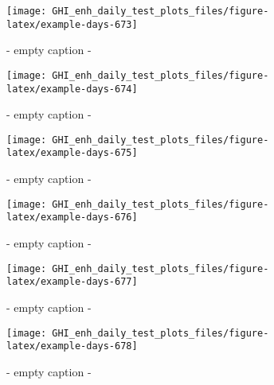 \documentclass[
  10pt,
  a4paper,oneside]{article}
\begin{document}
\begin{figure}[H]

{\centering \texttt{[image: GHI\_enh\_daily\_test\_plots\_files/figure-latex/example-days-673]} 

}

\caption{ - empty caption - }\label{fig:example-days-673}
\end{figure}

\begin{figure}[H]

{\centering \texttt{[image: GHI\_enh\_daily\_test\_plots\_files/figure-latex/example-days-674]} 

}

\caption{ - empty caption - }\label{fig:example-days-674}
\end{figure}

\begin{figure}[H]

{\centering \texttt{[image: GHI\_enh\_daily\_test\_plots\_files/figure-latex/example-days-675]} 

}

\caption{ - empty caption - }\label{fig:example-days-675}
\end{figure}

\begin{figure}[H]

{\centering \texttt{[image: GHI\_enh\_daily\_test\_plots\_files/figure-latex/example-days-676]} 

}

\caption{ - empty caption - }\label{fig:example-days-676}
\end{figure}

\begin{figure}[H]

{\centering \texttt{[image: GHI\_enh\_daily\_test\_plots\_files/figure-latex/example-days-677]} 

}

\caption{ - empty caption - }\label{fig:example-days-677}
\end{figure}

\begin{figure}[H]

{\centering \texttt{[image: GHI\_enh\_daily\_test\_plots\_files/figure-latex/example-days-678]} 

}

\caption{ - empty caption - }\label{fig:example-days-678}
\end{figure}
\end{document}
